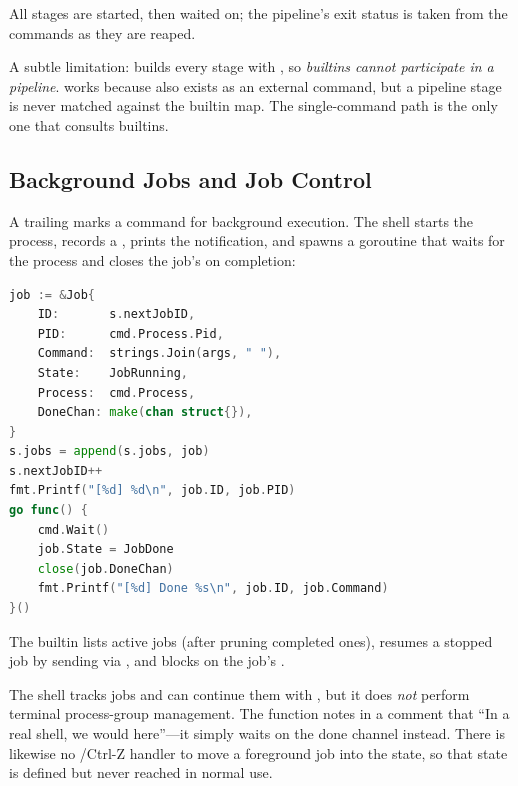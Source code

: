 All stages are started, then waited on; the pipeline's exit status is taken from
the commands as they are reaped.

\begin{warnbox}
A subtle limitation:  builds every stage with
, so \emph{builtins cannot participate in a pipeline}.
 works because  also exists as an external
 command, but a pipeline stage is never matched against the
builtin map. The single-command path is the only one that consults builtins.
\end{warnbox}

\subsection{Background Jobs and Job Control}

A trailing \code{\&} marks a command for background execution. The shell starts
the process, records a , prints the  notification, and
spawns a goroutine that waits for the process and closes the job's
 on completion:

\begin{lstlisting}[language=Go, caption={Launching and tracking a background job (shell/shell.go)}]
job := &Job{
    ID:       s.nextJobID,
    PID:      cmd.Process.Pid,
    Command:  strings.Join(args, " "),
    State:    JobRunning,
    Process:  cmd.Process,
    DoneChan: make(chan struct{}),
}
s.jobs = append(s.jobs, job)
s.nextJobID++
fmt.Printf("[%d] %d\n", job.ID, job.PID)
go func() {
    cmd.Wait()
    job.State = JobDone
    close(job.DoneChan)
    fmt.Printf("[%d] Done %s\n", job.ID, job.Command)
}()
\end{lstlisting}

The  builtin lists active jobs (after pruning completed ones),
 resumes a stopped job by sending  via
, and  blocks on the job's .

\begin{notebox}
The shell tracks jobs and can continue them with , but it does
\emph{not} perform terminal process-group management. The 
function notes in a comment that ``In a real shell, we would 
here''---it simply waits on the done channel instead. There is likewise no
/Ctrl-Z handler to move a foreground job into the 
state, so that state is defined but never reached in normal use.
\end{notebox}

